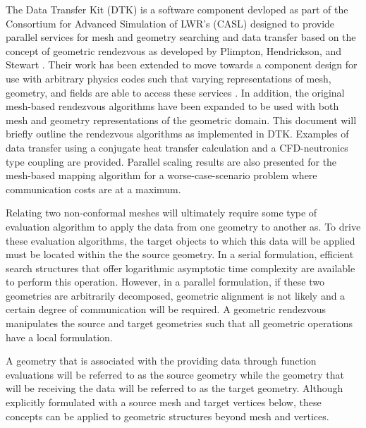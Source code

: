 \documentclass{mc2013}
\begin{document}
The Data Transfer Kit (DTK) is a software component devloped as part
of the Consortium for Advanced Simulation of LWR's (CASL)
\cite{u.s._department_of_energy_casl_2011} designed to provide
parallel services for mesh and geometry searching and data transfer
based on the concept of geometric rendezvous as developed by Plimpton,
Hendrickson, and Stewart \cite{Plimpton_2004}. Their work has been
extended to move towards a component design for use with arbitrary
physics codes such that varying representations of mesh, geometry, and
fields are able to access these services \cite{Chand_2008}. In
addition, the original mesh-based rendezvous algorithms have been
expanded to be used with both mesh and geometry representations of the
geometric domain. This document will briefly outline the rendezvous
algorithms as implemented in DTK. Examples of data transfer using a
conjugate heat transfer calculation and a CFD-neutronics type coupling
are provided. Parallel scaling results are also presented for the
mesh-based mapping algorithm for a worse-case-scenario problem where
communication costs are at a maximum.


\label{sec:geometric_rendezvous}

Relating two non-conformal meshes will ultimately require some type of
evaluation algorithm to apply the data from one geometry to another
as. To drive these evaluation algorithms, the target objects to which
this data will be applied must be located within the the source
geometry. In a serial formulation, efficient search structures that
offer logarithmic asymptotic time complexity are available to perform
this operation. However, in a parallel formulation, if these two
geometries are arbitrarily decomposed, geometric alignment is not
likely and a certain degree of communication will be required. A
geometric rendezvous manipulates the source and target geometries such
that all geometric operations have a local formulation.

A geometry that is associated with the providing data through function
evaluations will be referred to as the source geometry while the
geometry that will be receiving the data will be referred to as the
target geometry. Although explicitly formulated with a source mesh and
target vertices below, these concepts can be applied to geometric
structures beyond mesh and vertices.

\label{subsec:rendezvous_algorithm}
\end{document}
